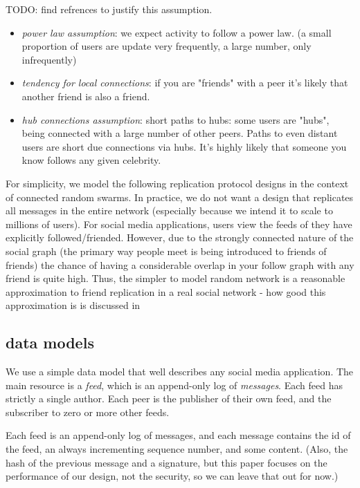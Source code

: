 \documentclass[sigconf]{acmart}
\begin{document}
TODO: find refrences to justify this assumption.

\begin{itemize}

\item {\em power law assumption}: we expect activity to follow a power
  law.  (a small proportion of users are update very frequently, a
  large number, only infrequently)

\item {\em tendency for local connections}: if you are "friends" with
  a peer it's likely that another friend is also a friend.

\item {\em hub connections assumption}: short paths to hubs: some
  users are "hubs", being connected with a large number of other
  peers. Paths to even distant users are short due connections via
  hubs. It's highly likely that someone you know follows any given
  celebrity.

\end{itemize}

For simplicity, we model the following replication protocol designs in
the context of connected random swarms.  In practice, we do not want a
design that replicates all messages in the entire network (especially
because we intend it to scale to millions of users). For social media
applications, users view the feeds of they have explicitly
followed/friended. However, due to the strongly connected nature of
the social graph (the primary way people meet is being introduced to
friends of friends) the chance of having a considerable overlap in
your follow graph with any friend is quite high. Thus, the simpler to
model random network is a reasonable approximation to friend
replication in a real social network - how good this approximation is
is discussed in


\subsection{data models}

We use a simple data model that well describes any social media
application.  The main resource is a {\em feed}, which is an
append-only log of {\em messages}.  Each feed has strictly a single
author. Each peer is the publisher of their own feed, and the
subscriber to zero or more other feeds.

Each feed is an append-only log of messages, and each message contains
the id of the feed, an always incrementing sequence number, and some
content.  (Also, the hash of the previous message and a signature, but
this paper focuses on the performance of our design, not the security,
so we can leave that out for now.)
\end{document}
